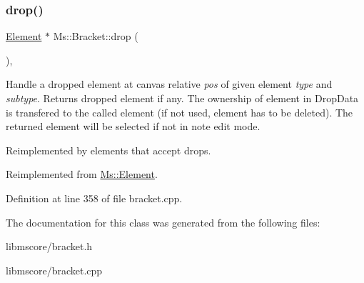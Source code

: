 \subsubsection{\texorpdfstring{drop()}{drop()}}
{\footnotesize\ttfamily \hyperlink{class_ms_1_1_element}{Element} $\ast$ Ms\+::\+Bracket\+::drop (\begin{DoxyParamCaption}\item[{\hyperlink{class_ms_1_1_edit_data}{Edit\+Data} \&}]{ }\end{DoxyParamCaption})\hspace{0.3cm}{\ttfamily [override]}, {\ttfamily [virtual]}}

Handle a dropped element at canvas relative {\itshape pos} of given element {\itshape type} and {\itshape subtype}. Returns dropped element if any. The ownership of element in Drop\+Data is transfered to the called element (if not used, element has to be deleted). The returned element will be selected if not in note edit mode.

Reimplemented by elements that accept drops. 

Reimplemented from \hyperlink{class_ms_1_1_element_a0ca69a9fb48e7b9fb481aacaf3860032}{Ms\+::\+Element}.



Definition at line 358 of file bracket.\+cpp.



The documentation for this class was generated from the following files\+:\begin{DoxyCompactItemize}
\item 
libmscore/bracket.\+h\item 
libmscore/bracket.\+cpp\end{DoxyCompactItemize}
